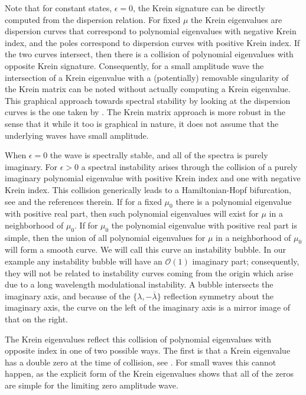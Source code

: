 \documentclass[review,onefignum,onetabnum]{siamart171218}
\newcommand{\calO}{\mathcal{O}}
\begin{document}
\begin{remark}
Note that for constant states, $\epsilon=0$, the Krein signature can be directly computed from the dispersion relation.  For fixed $\mu$ the Krein
eigenvalues are dispersion curves that correspond to polynomial eigenvalues
with negative Krein index, and the poles correspond to dispersion curves with
positive Krein index. If the two curves intersect, then there is a collision
of polynomial eigenvalues with opposite Krein signature. Consequently, for a small amplitude wave the intersection of a Krein eigenvalue with a (potentially) removable singularity of the Krein matrix can be noted
without actually computing a Krein eigenvalue. This graphical
approach towards spectral stability by looking at the dispersion curves is the one taken by \cite{deconinck:hfi16,kollar:dco19,trichtchenko:sop18}. The Krein matrix approach is more robust in the sense that it while it too is graphical in nature, it does not assume that the underlying waves have small amplitude.
\end{remark}

When $\epsilon=0$ the wave is spectrally stable, and all of the spectra is purely imaginary. For $\epsilon>0$ a spectral instability arises through the collision of a purely imaginary
polynomial eigenvalue with positive Krein index and one with negative Krein
index. This collision generically leads to a Hamiltonian-Hopf bifurcation,
see \cite[Chapter~7.1.2]{kapitula:sad13} and the references therein. If for a fixed $\mu_0$ there is a polynomial eigenvalue
with positive real part, then such polynomial eigenvalues will exist for $\mu$ in a
neighborhood of $\mu_0$. If for $\mu_0$ the polynomial eigenvalue with positive real part is simple, then the union of all polynomial eigenvalues for $\mu$ in a neighborhood of $\mu_0$ will form a smooth curve. We will call this curve an instability bubble. In our example any instability bubble will have an $\calO(1)$
imaginary part; consequently, they will not be related to instability curves coming from the origin which arise due to a long wavelength modulational instability.
A bubble intersects the imaginary axis, and because of the
$\{\lambda,-\overline{\lambda}\}$ reflection symmetry about the imaginary
axis, the curve on the left of the imaginary axis is a mirror image of that
on the right.

The Krein eigenvalues reflect this collision of polynomial eigenvalues with opposite index in one of two possible ways. The
first is that a Krein eigenvalue has a double zero at the time of collision,
see \cite[Lemma~2.8]{kapitula:tks10}. For small waves this cannot happen, as
the explicit form of the Krein eigenvalues shows that all of the zeros are
simple for the limiting zero amplitude wave.
\end{document}
